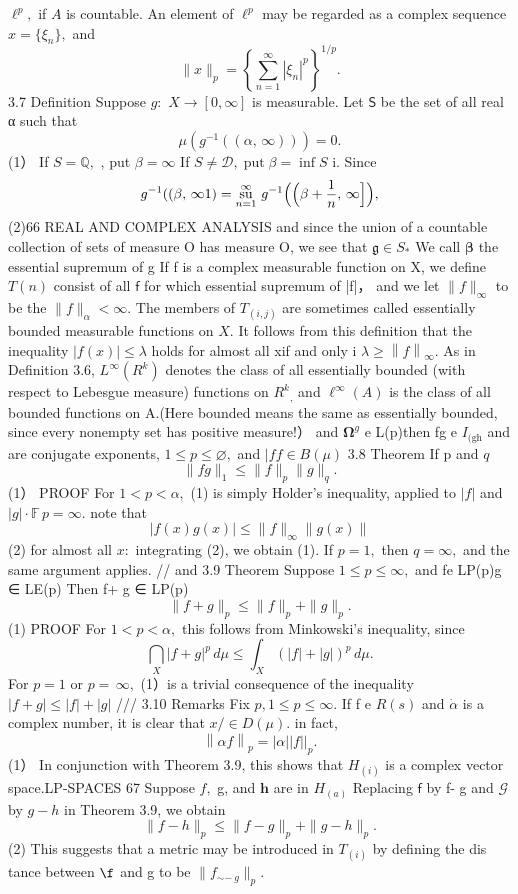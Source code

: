 $\ell^{p},$ if $\scriptstyle A$ is countable. An element of $\ell^{p}$ may be regarded as a complex sequence $x=\{\xi_{n}\},$ and $$ \|x\|_{p}=\left\{\sum_{n=1}^{\infty}|\xi_{n}|^{p}\right\}^{1/p}. $$ 3.7 Definition Suppose $g\colon$ $X\to[0,\infty]$ is measurable. Let $\boldsymbol{\mathsf{S}}$ be the set of all real α such that $$ \mu(g^{-1}((\alpha,\,\infty)))=0. $$ (1） If $S=\mathbb{Q},$ , put $\beta=\infty$ If $S\neq{\mathcal{D}},\operatorname{put}\beta=\operatorname{inf}S$ i. Since $$ g^{-1}((\beta,\,\infty{1})=\operatorname*{su}_{n=1}^{\infty}\,g^{-1}\Bigl(\Bigl(\beta+{\frac{1}{n}},\,\infty\Bigr]\Bigr), $$ (2)66 REAL AND COMPLEX ANALYSIS and since the union of a countable collection of sets of measure O has measure O, we see that ${\mathfrak{g}}\in S_{*}$ We call $\boldsymbol{\beta}$ the essential supremum of g If f is a complex measurable function on X, we define $\scriptstyle T(n)$ consist of all $\boldsymbol{\mathsf{f}}$ for which essential supremum of |f|， and we let $\|f\|_{\infty}$ to be the $\|f\|_{\alpha}<\infty.$ The members of $\scriptstyle T_{(i,j)}$ are sometimes called essentially bounded measurable functions on $X.$ It follows from this definition that the inequality $|f(x)|\leq\lambda$ holds for almost all xif and only i $\lambda\geq\left\|f\right\|_{\infty}.$ As in Definition 3.6, $L^{\infty}(R^{k})$ denotes the class of all essentially bounded (with respect to Lebesgue measure) functions on $R^{k}{}_{,}$ and $\ell^{\infty}(A)$ is the class of all bounded functions on A.(Here bounded means the same as essentially bounded, since every nonempty set has positive measure!） and $\mathbf{\Omega}^{g}$ e L(p)then fg e $\scriptstyle I_{\mathrm{(gh}}$ and are conjugate exponents, $1\leq p\leq\varnothing,$ and $|f f\in B(\mu)$ 3.8 Theorem If p and $\boldsymbol{\mathit{q}}$ $$ \|f g\|_{1}\leq\|f\|_{p}\|g\|_{q}. $$ (1） PROOF For $1<p<\alpha,$ (1) is simply Holder's inequality, applied to $|f|$ and $|g|\cdot\mathbb{F}\,p=\infty.$ note that $$ |f(x)g(x)|\leq\|f\|_{\infty}\|g(x)\| $$ (2) for almost all $x\colon$ integrating (2), we obtain (1). If $p=1,$ then $q=\infty,$ and the same argument applies. // and 3.9 Theorem Suppose $1\leq p\leq\infty,$ and fe LP(p)g ∈ LE(p) Then f+ g ∈ LP(p) $$ \|f+g\|_{p}\leq\|f\|_{p}+\|g\|_{p}. $$ (1) PROOF For $1<p<\alpha,$ this follows from Minkowski's inequality, since $$ \bigcap_{X}|f+g|^{p}\,d\mu\leq\int_{X}(|f|+|g|)^{p}\,d\mu. $$ For $p=1$ or $p=\,\infty,$ (1）is a trivial consequence of the inequality $|f+g|\leq|f|+|g|$ /// 3.10 Remarks Fix $p,1\leq p\leq\infty.$ If f e $\scriptstyle R(s)$ and $\scriptstyle{\dot{\alpha}}$ is a complex number, it is clear that $x/\in D(\mu).$ in fact, $$ \left\|\alpha f\right\|_{p}=\left|\alpha\left| |f\right|\right|_{p}. $$ (1） In conjunction with Theorem 3.9, this shows that $\scriptstyle{H_{(i)}}$ is a complex vector space.LP-SPACES 67 Suppose $f,$ g, and ${\boldsymbol{h}}$ are in $\scriptstyle{H_{(a)}}$ Replacing $\boldsymbol{\mathsf{f}}$ by f- g and $\scriptstyle{\mathcal{G}}$ by $\scriptstyle{g-h}$ in Theorem 3.9, we obtain $$ \|f-h\|_{p}\leq\|f-g\|_{p}+\|g-h\|_{p}. $$ (2) This suggests that a metric may be introduced in $\scriptstyle T_{(i)}$ by defining the dis tance between $\boldsymbol{\f}$ and g to be $\|f_{\sim-\ g}\|_{p}.$ 